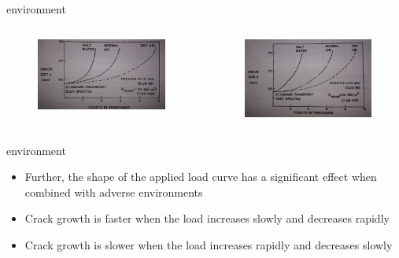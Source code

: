 \documentclass[10pt]{beamer}
\begin{document}
\begin{frame}{environment}
	\begin{columns}
		\begin{column}{0.45\textwidth}
			\begin{figure}
			\centering
			\includegraphics[width=1.0\linewidth]{../Figures/environment_7075}
			\label{fig:environment_7075}
			\end{figure}
		\end{column}
		\begin{column}{0.45\textwidth}
			\begin{figure}
			\centering
			\includegraphics[width=1.0\linewidth]{../Figures/environment_2024}
			\label{fig:environment_2024}
			\end{figure}
		\end{column}
	\end{columns}
\end{frame}

\begin{frame}{environment}
	\begin{itemize}[<+->]
		\item Further, the shape of the applied load curve has a significant effect when combined with adverse environments
		\item Crack growth is faster when the load increases slowly and decreases rapidly
		\item Crack growth is slower when the load increases rapidly and decreases slowly
	\end{itemize}
\end{frame}
\end{document}
